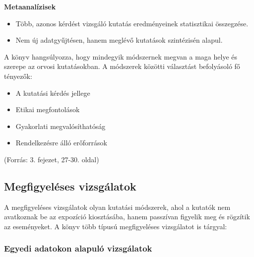 \documentclass[a4paper,12pt]{article}
\begin{document}
\textbf{Metaanalízisek}
\begin{itemize} 
\item Több, azonos kérdést vizsgáló kutatás eredményeinek statisztikai összegzése.
\item Nem új adatgyűjtésen, hanem meglévő kutatások szintézisén alapul.
\end{itemize}

A könyv hangsúlyozza, hogy mindegyik módszernek megvan a maga helye és szerepe az orvosi kutatásokban. A módszerek közötti választást befolyásoló fő tényezők:

\begin{itemize} 
\item A kutatási kérdés jellege
\item Etikai megfontolások
\item Gyakorlati megvalósíthatóság
\item Rendelkezésre álló erőforrások
\end{itemize}

(Forrás: 3. fejezet, 27-30. oldal)

\subsection{Megfigyeléses vizsgálatok}

A megfigyeléses vizsgálatok olyan kutatási módszerek, ahol a kutatók nem avatkoznak be az expozíció kiosztásába, hanem passzívan figyelik meg és rögzítik az eseményeket. A könyv több típusú megfigyeléses vizsgálatot is tárgyal:

\subsubsection{Egyedi adatokon alapuló vizsgálatok}
\end{document}
